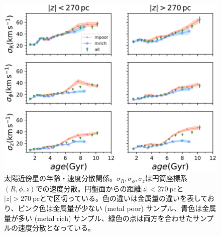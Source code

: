 \begin{figure}[htbp]
	\centering
	\includegraphics[width=12cm]{fig/YuLiu18_VD.pdf}
	\caption{太陽近傍星の年齢・速度分散関係\cite{YL18}。$\sigma_R,\sigma_{\phi},\sigma_z$は円筒座標系$(R,\phi,z)$での速度分散。円盤面からの距離$|z|<270\ \mathrm{pc}$と$|z|>270\ \mathrm{pc}$とで区切っている。色の違いは金属量の違いを表しており、ピンク色は金属量が少ない (metal poor) サンプル、青色は金属量が多い (metal rich) サンプル、緑色の点は両方を合わせたサンプルの速度分散となっている。}
	\label{VDbyYL18}
\end{figure}


